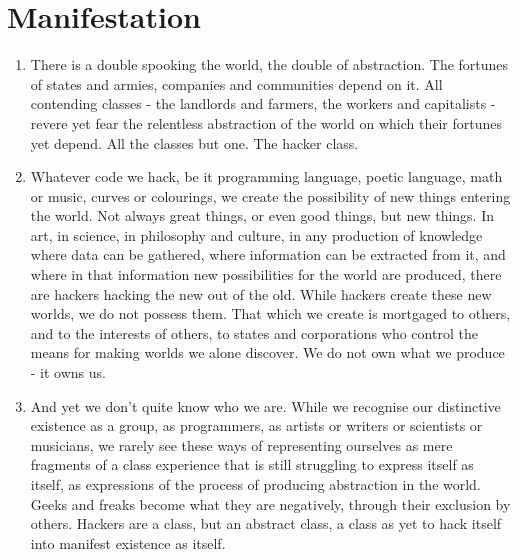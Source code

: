 \documentclass[letterpaper,12pt,english]{sphinxmanual}
\begin{document}
\section{Manifestation}
\label{wark:manifestation}\begin{enumerate}
\item {} 
There is a double spooking the world, the double of abstraction. The fortunes of states and armies, companies and communities depend on it. All contending classes - the landlords and farmers, the workers and capitalists - revere yet fear the relentless abstraction of the world on which their fortunes yet depend. All the classes but one. The hacker class.

\item {} 
Whatever code we hack, be it programming language, poetic language, math or music, curves or colourings, we create the possibility of new things entering the world. Not always great things, or even good things, but new things. In art, in science, in philosophy and culture, in any production of knowledge where data can be gathered, where information can be extracted from it, and where in that information new possibilities for the world are produced, there are hackers hacking the new out of the old. While hackers create these new worlds, we do not possess them. That which we create is mortgaged to others, and to the interests of others, to states and corporations who control the means for making worlds we alone discover. We do not own what we produce - it owns us.

\item {} 
And yet we don't quite know who we are. While we recognise our distinctive existence as a group, as programmers, as artists or writers or scientists or musicians, we rarely see these ways of representing ourselves as mere fragments of a class experience that is still struggling to express itself as itself, as expressions of the process of producing abstraction in the world. Geeks and freaks become what they are negatively, through their exclusion by others. Hackers are a class, but an abstract class, a class as yet to hack itself into manifest existence as itself.

\end{enumerate}
\end{document}
